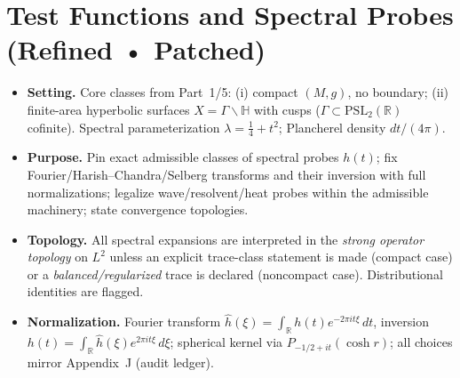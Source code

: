 
\section{Test Functions and Spectral Probes (Refined • Patched)}
\label{sec:test-functions-sharp-patched}

\begin{tcolorbox}[colback=gray!5,colframe=gray!55,
  title=Scope \& Assumptions (ZNB-9+++ Brilliants+++ • enforced)]
\begin{itemize}
  \item \textbf{Setting.} Core classes from Part~1/5: (i) compact $(M,g)$, no boundary; (ii) finite-area hyperbolic surfaces $X=\Gamma\backslash\mathbb H$ with cusps ($\Gamma\subset\mathrm{PSL}_2(\mathbb R)$ cofinite). Spectral parameterization $\lambda=\tfrac14+t^2$; Plancherel density $dt/(4\pi)$.
  \item \textbf{Purpose.} Pin exact admissible classes of spectral probes $h(t)$; fix Fourier/Harish–Chandra/Selberg transforms and their inversion with full normalizations; legalize wave/resolvent/heat probes within the admissible machinery; state convergence topologies.
  \item \textbf{Topology.} All spectral expansions are interpreted in the \emph{strong operator topology} on $L^2$ unless an explicit trace-class statement is made (compact case) or a \emph{balanced/regularized} trace is declared (noncompact case). Distributional identities are flagged.
  \item \textbf{Normalization.} Fourier transform
  \(
    \hat h(\xi)=\int_{\mathbb R} h(t)e^{-2\pi i t\xi}\,dt
  \),
  inversion
  \(
    h(t)=\int_{\mathbb R}\hat h(\xi)e^{2\pi i t\xi}\,d\xi
  \);
  spherical kernel via $P_{-1/2+it}(\cosh r)$; all choices mirror Appendix~J (audit ledger).
\end{itemize}
\end{tcolorbox}

